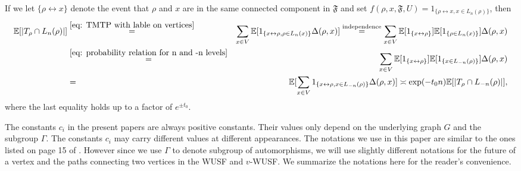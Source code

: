 \documentclass[12pt]{article}
\numberwithin{equation}{section}
\newcommand{\1}{\mathbf{1}}
\begin{document}
 If we let $\{\rho\leftrightarrow x \}$ denote the event that $\rho$ and $x$ are in the same connected component in $\mathfrak{F}$ and set  $f(\rho,x,\mathfrak{F},U)=1_{\{ \rho\leftrightarrow x, x\in L_n(\rho)   \}}$, then 
 \begin{eqnarray}\label{eq: expectation relation between n and -n level}
 \mathbb{E}[|T_\rho\cap L_n(\rho)|]&\stackrel{ \eqref{eq: TMTP with lable on vertices}}{=}&\sum_{x\in V}{\mathbb{E}[1_{\{ x\leftrightarrow \rho, \rho\in L_n(x)   \}}\Delta(\rho,x) ] }
 \stackrel{\textnormal{independence}}{=}\sum_{x\in V}{\mathbb{E}[1_{\{ x\leftrightarrow \rho\}}]\mathbb{E}[1_{\{\rho\in L_n(x)   \}}]\Delta(\rho,x)  }\nonumber\\
&\stackrel{\eqref{eq: probability relation for n and -n levels}}{=}&
\sum_{x\in V}{\mathbb{E}[1_{\{ x\leftrightarrow \rho\}}]\mathbb{E}[1_{\{x\in L_{-n}(\rho)   \}}]\Delta(\rho,x)  }\nonumber\\
&=&\mathbb{E}[\sum_{x\in V}1_{\{ x\leftrightarrow \rho, x\in L_{-n}(\rho)   \}}\Delta(\rho,x) ]
\asymp \exp(-t_0n)\mathbb{E}[|T_\rho\cap L_{-n}(\rho)|],
 \end{eqnarray}
 where the last equality holds up to a factor of $e^{\pm t_0}$.
 
 The constants $c_i$ in the present papers are always positive constants. Their values only depend on the underlying graph $G$ and the subgroup $\Gamma$. The constants $c_i$ may carry different values at different appearances.  The notations we use in this paper are similar to the ones listed on page 15 of \cite{Hutchcroft2018a}. However since we use $\Gamma$ to denote subgroup of automorphisms, we will use slightly different notations for the future of a vertex and  the paths connecting two vertices in the WUSF and $v$-WUSF. We summarize the  notations here for the reader's convenience.
 
\end{document}
